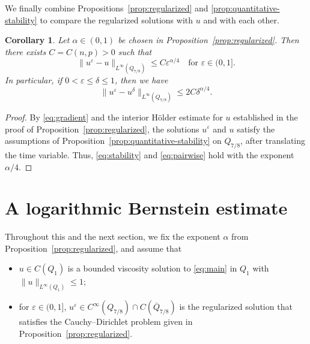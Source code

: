 \documentclass[a4paper,11pt]{amsart}
\theoremstyle{plain}
\newtheorem{corollary}[theorem]{Corollary}
\theoremstyle{definition}
\newtheorem{remark}[theorem]{Remark}
\numberwithin{equation}{section}
\begin{document}




We finally combine Propositions~\ref{prop:regularized} and \ref{prop:quantitative-stability} to compare the regularized solutions with $u$ and with each other.

\begin{corollary}\label{cor:approximation}
Let $\alpha \in (0,1)$ be chosen in Proposition~\ref{prop:regularized}. Then there exists $C=C(n,p)>0$ such that
\begin{equation}\label{eq:stability}
 \|u^\varepsilon-u\|_{L^\infty(Q_{7/8})}\leq C\varepsilon^{\alpha/4}
 \quad \text{for $\varepsilon \in (0,1]$}.
\end{equation}
In particular, if $0<\varepsilon \leq \delta \leq 1$, then we have
\begin{equation}\label{eq:pairwise}
 \|u^\varepsilon-u^\delta\|_{L^\infty(Q_{7/8})}\leq 2C\delta^{\alpha/4}.
\end{equation}
\end{corollary}

\begin{proof}
By \eqref{eq:gradient} and the interior H\"older estimate for $u$ established in the proof of Proposition~\ref{prop:regularized}, the solutions $u^\varepsilon$ and $u$ satisfy the assumptions of Proposition~\ref{prop:quantitative-stability} on $Q_{7/8}$, after translating the time variable. Thus, \eqref{eq:stability} and \eqref{eq:pairwise} hold with the exponent $\alpha/4$.
\end{proof}

\section{A logarithmic Bernstein estimate}\label{sec:log-lipschitz}
Throughout this and the next section, we fix the exponent $\alpha$ from Proposition~\ref{prop:regularized}, and assume that 
\begin{itemize}
    \item $u \in C(Q_1)$ is a bounded viscosity solution to \eqref{eq:main} in $Q_1$ with $\|u\|_{L^\infty(Q_1)}\leq1$;

    \item for $\varepsilon \in (0,1]$, $u^{\varepsilon} \in C^{\infty}(Q_{7/8}) \cap C(\overline{Q}_{7/8})$ is the regularized solution that satisfies the Cauchy--Dirichlet problem given in Proposition~\ref{prop:regularized}.
\end{itemize}
\end{document}
